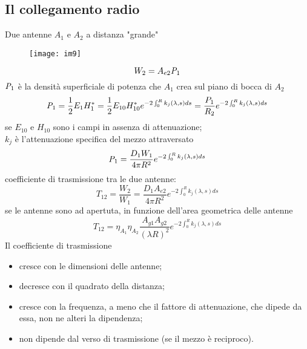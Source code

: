 \documentclass[a4paper]{article}
\begin{document}
\subsection*{Il collegamento radio}
Due antenne $A_1$ e $A_2$ a distanza "grande"
\begin{figure}[ht] 
\centering
\texttt{[image: im9]}
\end{figure}
\begin{equation*}
W_2=A_{e2}\emph{P}_1
\end{equation*}
$\emph{P}_1$ è la densità superficiale di potenza che $A_1$ crea sul piano di bocca di $A_2$
\begin{equation*}
\emph{P}_1=\frac{1}{2}E_1H_1^*=\frac{1}{2}E_{10}H_{10}^*e^{-2\int_0^Rk_j(\lambda,s)ds}=\frac{P_1}{R_2}e^{-2\int_0^Rk_j(\lambda,s)ds}
\end{equation*}
se $E_{10}$ e $H_{10}$ sono i campi in assenza di attenuazione;\\
$k_j$ è l'attenuazione specifica del mezzo attraversato
\begin{equation*}
\emph{P}_1=\frac{D_1W_1}{4\pi R^2}e^{-2\int_0^Rk_j(\lambda,s)ds}
\end{equation*}
coefficiente di trasmissione tra le due antenne:
\begin{equation*}
T_{12}=\frac{W_2}{W_1}=\frac{D_1A_{e2}}{4\pi R^2}e^{-2\int_0^Rk_j(\lambda,s)ds}
\end{equation*}
se le antenne sono ad apertuta, in funzione dell'area geometrica delle antenne
\begin{equation*}
T_{12}=\eta_{A_1}\eta_{A_2}\frac{A_{g1}A_{g2}}{(\lambda R)^2}e^{-2\int_0^Rk_j(\lambda,s)ds}
\end{equation*}
Il coefficiente di trasmissione
\begin{itemize}
\item cresce con le dimensioni delle antenne;
\item decresce con il quadrato della distanza;
\item cresce con la frequenza, a meno che il fattore di attenuazione, che dipede da essa, non ne alteri la dipendenza;
\item non dipende dal verso di trasmissione (se il mezzo è reciproco). 
\end{itemize}
\end{document}
